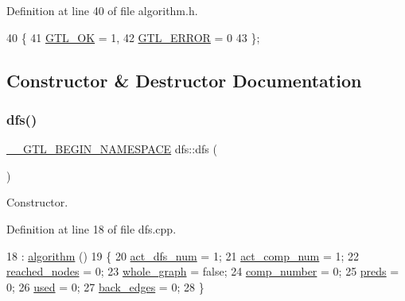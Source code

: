 Definition at line 40 of file algorithm.\+h.


\begin{DoxyCode}
40          \{
41     \mbox{\hyperlink{classalgorithm_af1a0078e153aa99c24f9bdf0d97f6710a5114c20e4a96a76b5de9f28bf15e282b}{GTL\_OK}} = 1,
42     \mbox{\hyperlink{classalgorithm_af1a0078e153aa99c24f9bdf0d97f6710a6fcf574690bbd6cf710837a169510dd7}{GTL\_ERROR}} = 0
43     \};
\end{DoxyCode}


\subsection{Constructor \& Destructor Documentation}
\mbox{\label{classdfs_afe4e213d3f1f88a4ff57b2d72de232f4}} 
\subsubsection{\texorpdfstring{dfs()}{dfs()}}
{\footnotesize\ttfamily \mbox{\hyperlink{_g_t_l_8h_a2d9f24096ac60918452dd51f32b64aa9}{\+\_\+\+\_\+\+G\+T\+L\+\_\+\+B\+E\+G\+I\+N\+\_\+\+N\+A\+M\+E\+S\+P\+A\+CE}} dfs\+::dfs (\begin{DoxyParamCaption}{ }\end{DoxyParamCaption})}



Constructor. 



Definition at line 18 of file dfs.\+cpp.


\begin{DoxyCode}
18           : \mbox{\hyperlink{classalgorithm_ab79e1ddec2f2afdf4b36b10724db8b15}{algorithm}} () 
19 \{
20     \mbox{\hyperlink{classdfs_aedaf2b485ff83150b1de6c305922473b}{act\_dfs\_num}} = 1;
21     \mbox{\hyperlink{classdfs_ab0251ac30adfd569e214a64db7f3a905}{act\_comp\_num}} = 1;
22     \mbox{\hyperlink{classdfs_acb11186a1a2a2a1f38cdc0674340ba37}{reached\_nodes}} = 0;
23     \mbox{\hyperlink{classdfs_ab8342c80ab208ef0e0d781f0769d0d95}{whole\_graph}} = \textcolor{keyword}{false};
24     \mbox{\hyperlink{classdfs_a00db016ac7eab69045cae408008890c1}{comp\_number}} = 0;
25     \mbox{\hyperlink{classdfs_a3fdeb5a211a1bc1753b2a637258c5355}{preds}} = 0;
26     \mbox{\hyperlink{classdfs_afc18288747491be301d6d8d85d8f220b}{used}} = 0;
27     \mbox{\hyperlink{classdfs_a1dc18a7df8d6b238d5301c92fc7540fa}{back\_edges}} = 0;
28 \}
\end{DoxyCode}
\mbox{\label{classdfs_aff2e95c12935221a94551393f7e36c6e}} 
